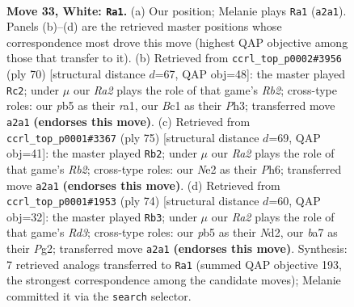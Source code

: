 \documentclass[11pt]{article}
\begin{document}
\clearpage

\begin{figure}[p]\centering
\begin{subfigure}{0.46\textwidth}\centering
\resizebox{\linewidth}{!}{%
\newchessgame
\chessboard[
  setfen={r3k3/b3n3/8/pp2p3/b1p3P1/P1P5/R2NNP2/2B1K3 w - - 2 33},
  showmover=false,
  pgfstyle=straightmove, color=movearrow, markmove={a2-a1}
]}
\caption{}
\end{subfigure}\hfill
\begin{subfigure}{0.46\textwidth}\centering
\resizebox{\linewidth}{!}{%
\newchessgame
\chessboard[
  setfen={6bk/7p/3b2p1/1p6/1P1pB3/3P1KPP/1R2N3/r7 w - - 4 36},
  showmover=false,
  pgfstyle=straightmove, color=movearrow, markmove={b2-c2}
]}
\caption{}
\end{subfigure}
\\[4pt]
\begin{subfigure}{0.46\textwidth}\centering
\resizebox{\linewidth}{!}{%
\newchessgame
\chessboard[
  setfen={1b6/1r3pk1/5npp/8/R1B1p1P1/4P2P/3N1PK1/8 b - - 3 38},
  showmover=false,
  pgfstyle=straightmove, color=movearrow, markmove={b7-b2}
]}
\caption{}
\end{subfigure}\hfill
\begin{subfigure}{0.46\textwidth}\centering
\resizebox{\linewidth}{!}{%
\newchessgame
\chessboard[
  setfen={2r2bk1/8/4pn1p/4p1p1/4P3/3RB2P/3N1PPK/8 w - - 2 38},
  showmover=false,
  pgfstyle=straightmove, color=movearrow, markmove={d3-b3}
]}
\caption{}
\end{subfigure}
\caption{\textbf{Move 33, White: \texttt{Ra1}.} (a) Our position; Melanie plays \texttt{Ra1} (\texttt{a2a1}). Panels (b)--(d) are the retrieved master positions whose correspondence most drove this move (highest QAP objective among those that transfer to it). (b) Retrieved from \texttt{ccrl\_top\_p0002\#3956} (ply 70) [structural distance $d$=67, QAP obj=48]: the master played \texttt{Rc2}; under $\mu$ our \emph{Ra2} plays the role of that game's \emph{Rb2}; cross-type roles: our \emph{p}b5 as their \emph{r}a1, our \emph{B}c1 as their \emph{P}h3; transferred move \texttt{a2a1} \textbf{(endorses this move)}. (c) Retrieved from \texttt{ccrl\_top\_p0001\#3367} (ply 75) [structural distance $d$=69, QAP obj=41]: the master played \texttt{Rb2}; under $\mu$ our \emph{Ra2} plays the role of that game's \emph{Rb2}; cross-type roles: our \emph{N}e2 as their \emph{P}h6; transferred move \texttt{a2a1} \textbf{(endorses this move)}. (d) Retrieved from \texttt{ccrl\_top\_p0001\#1953} (ply 74) [structural distance $d$=60, QAP obj=32]: the master played \texttt{Rb3}; under $\mu$ our \emph{Ra2} plays the role of that game's \emph{Rd3}; cross-type roles: our \emph{p}b5 as their \emph{N}d2, our \emph{b}a7 as their \emph{P}g2; transferred move \texttt{a2a1} \textbf{(endorses this move)}. Synthesis: 7 retrieved analogs transferred to \texttt{Ra1} (summed QAP objective 193, the strongest correspondence among the candidate moves); Melanie committed it via the \texttt{search} selector.}
\label{fig:thought-m64}
\end{figure}
\end{document}
